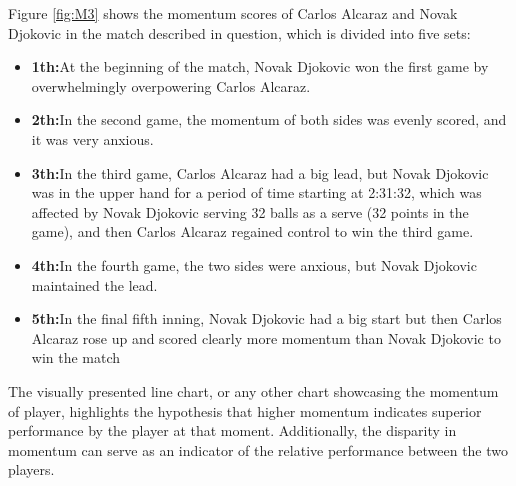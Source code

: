 Figure \ref{fig:M3} shows the momentum scores of Carlos Alcaraz and Novak Djokovic in the match described in question, which is divided into five sets:
\begin{itemize}
    \item \textbf{1th:}At the beginning of the match, Novak Djokovic won the first game by overwhelmingly overpowering Carlos Alcaraz.
    \item \textbf{2th:}In the second game, the momentum of both sides was evenly scored, and it was very anxious.
    \item \textbf{3th:}In the third game, Carlos Alcaraz had a big lead, but Novak Djokovic was in the upper hand for a period of time starting at 2:31:32, which was affected by Novak Djokovic serving 32 balls as a serve (32 points in the game), and then Carlos Alcaraz regained control to win the third game.
    \item \textbf{4th:}In the fourth game, the two sides were anxious, but Novak Djokovic maintained the lead.
    \item \textbf{5th:}In the final fifth inning, Novak Djokovic had a big start but then Carlos Alcaraz rose up and scored clearly more momentum than Novak Djokovic to win the match
\end{itemize}

The visually presented line chart, or any other chart showcasing the momentum of player, highlights the hypothesis that higher momentum indicates superior performance by the player at that moment. Additionally, the disparity in momentum can serve as an indicator of the relative performance between the two players.





